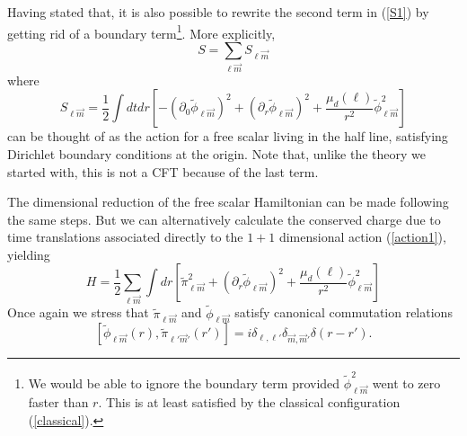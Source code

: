 \documentclass[12pt,a4paper]{article}
\begin{document}
Having stated that, it is also possible to rewrite the second term in (\ref{S1}) by getting rid of a boundary term\footnote{We would be able to ignore the boundary term provided $ \widetilde{\phi}_{\ell\vec{m}} ^2$ went to zero faster than $r$. This is at least satisfied by the classical configuration (\ref{classical}).}. More explicitly, 
\begin{equation}
S=\sum_{\ell \vec{m}}S_{\ell \vec{m}}
\end{equation}
where 
\begin{equation}\label{action1}
S_{\ell \vec{m}}=\frac{1}{2}\int dt dr \left[-(\partial_0 \widetilde{\phi}_{\ell\vec{m}})^2 +(\partial_r \widetilde{\phi}_{\ell\vec{m}})^2+\frac{\mu_d(\ell)}{r^2} \widetilde{\phi}_{\ell\vec{m}} ^2 \right]
\end{equation}
can be thought of as the action for a free scalar living in the half line, satisfying Dirichlet boundary conditions at the origin. Note that, unlike the theory we started with, this is not a CFT because of the last term.

The dimensional reduction of the free scalar Hamiltonian can be made following the same steps. But we can alternatively calculate the conserved charge due to time translations associated directly to the $1+1$ dimensional action (\ref{action1}), yielding 
\begin{equation}\label{Hscalar}
H=\frac{1}{2}\sum_{\ell \vec{m}}\int  dr \left[\widetilde{\pi}_{\ell\vec{m}}^2 +(\partial_r \widetilde{\phi}_{\ell\vec{m}})^2+\frac{\mu_d(\ell)}{r^2} \widetilde{\phi}_{\ell\vec{m}} ^2 \right]
\end{equation}
Once again we stress that $\widetilde{\pi}_{\ell\vec{m}}$ and $\widetilde{\phi}_{\ell\vec{m}}$ satisfy canonical commutation relations
\begin{equation}
\left[\widetilde{\phi}_{\ell\vec{m}}(r),\widetilde{\pi}_{\ell'\vec{m}'}(r')\right]=i \delta_{\ell,\ell '}\delta_{\vec{m},\vec{m} '}\delta(r-r').
\end{equation}
\end{document}
